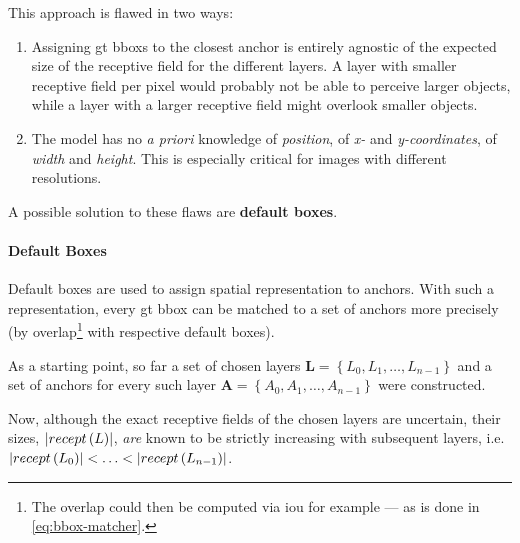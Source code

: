 This approach is flawed in two ways:
\begin{enumerate}
    \item Assigning \gls{gt} \glspl{bbox} to the closest anchor is entirely agnostic
    of the expected size of the receptive field for the different layers. A layer
    with smaller receptive field per pixel would probably not be able to perceive
    larger objects, while a layer with a larger receptive field might overlook
    smaller objects.\label{itm:anchor-flaw1}
    \item The model has no \textit{a priori} knowledge of \emph{position}, of
    \emph{x-} and \emph{y-coordinates}, of \emph{width} and \emph{height}.
    This is especially critical for images with different resolutions.\label{itm:anchor-flaw2}
\end{enumerate}
A possible solution to these flaws are \textbf{default boxes}.

\paragraph{Default Boxes}\label{par:default-boxes}
Default boxes are used to assign spatial representation to anchors. With such a
representation, every \gls{gt} \gls{bbox} can be matched to a set of anchors
more precisely (by overlap\footnote{The overlap could then be computed via
\gls{iou} for example --- as is done in \cref{eq:bbox-matcher}.} with respective
default boxes).

As a starting point, so far a set of chosen layers \(\mathbf{L} = \left\{L_0, L_1, \ldots, L_{n-1}\right\}\)
and a set of anchors for every such layer\footnotemark{} \(\mathbf{A} = \left\{A_0, A_1, \ldots, A_{n-1}\right\}\)
were constructed.


Now, although the exact receptive fields of the chosen \glspl{layer} are uncertain,
their sizes, \(\abs*{recept\left(L\right)}\), \emph{are} known to be strictly
increasing with subsequent layers, i.e.\ \(\abs*{recept\left(L_0\right)} < \ldots < \abs*{recept\left(L_{n-1}\right)}\).

